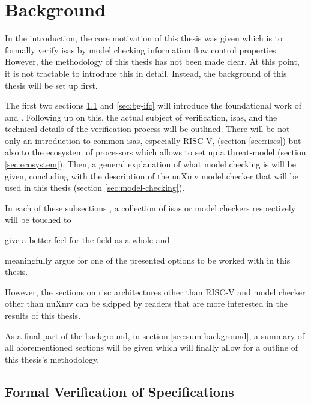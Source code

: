 
\chapter{Background}
\label{chp:background}

In the introduction, the core motivation of this thesis was given which is to formally verify \glspl{isa} by model checking information flow control properties.
However, the methodology of this thesis has not been made clear.
At this point, it is not tractable to introduce this in detail.
Instead, the background of this thesis will be set up first.

The first two sections \ref{sec:verify-spec} and \ref{sec:bg-ifc} will introduce the foundational work of \citeauthor{Reid17} \cite{Reid17} and \citeauthor{Ferraiuolo17} \cite{Ferraiuolo17}.
Following up on this, the actual subject of verification, \glspl{isa}, and the technical details of the verification process will be outlined.
There will be not only an introduction to common \glspl{isa}, especially RISC-V, (section \ref{sec:riscs}) but also to the ecosystem of processors which allows to set up a threat-model (section \ref{sec:ecosystem}).
Then, a general explanation of what model checking is will be given, concluding with the description of the nuXmv model checker that will be used in this thesis (section \ref{sec:model-checking}).

In each of these subsections , a collection of \glspl{isa} or model checkers respectively will be touched to \begin{enumerate*}[label=\alph*)]
    \item give a better feel for the field as a whole and
    \item meaningfully argue for one of the presented options to be worked with in this thesis.
\end{enumerate*}
However, the sections on \gls{risc} architectures other than RISC-V and model checker other than nuXmv can be skipped by readers that are more interested in the results of this thesis.

As a final part of the background, in section \ref{sec:sum-background}, a summary of all aforementioned sections will be given which will finally allow for a outline of this thesis's methodology.

\section{Formal Verification of Specifications}
\label{sec:verify-spec}

